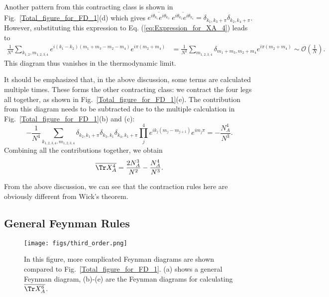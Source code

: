 Another pattern from this contracting class is shown in Fig.~\ref{Total_figure_for_FD_1}(d)
which gives $\overline{e^{i\theta_{k_{1}}}e^{i\theta_{k_{3}}}}\;\overline{e^{i\theta_{k_{2}}}e^{i\theta_{k_{4}}}}=\delta_{k_{1},k_{3}+\pi}\delta_{k_{2},k_{4}+\pi}$.
However, substituting this expression to Eq. (\ref{eq:Expression_for_XA_4})
leads to
\begin{equation}
\begin{aligned}\frac{1}{N^{4}}\sum_{k_{1,2},m_{1,2,3,4}}e^{i(k_{1}-k_{2})(m_{1}+m_{3}-m_{2}-m_{4})}e^{i\pi(m_{2}+m_{4})} & =\frac{1}{N^{2}}\sum_{m_{1,2,3,4}}\delta_{m_{1}+m_{3},m_{2}+m_{4}}e^{i\pi(m_{2}+m_{4})} \sim \mathcal{O}\left(\frac{1}{N}\right).
\end{aligned}
\end{equation}
This diagram thus %
vanishes in the thermodynamic limit. 

It should be emphasized that, in the above discussion, some terms %
are calculated multiple times.
These forms the other contracting class: we contract the four legs
all together, as shown in Fig.~\ref{Total_figure_for_FD_1}(e). The
contribution from this diagram needs to be subtracted due to the multiple
calculation in Fig.~\ref{Total_figure_for_FD_1}(b) and (c):
\begin{equation}
-\frac{1}{N^{4}}\sum_{k_{1,2,3,4},m_{1,2,3,4}}\delta_{k_{2},k_{1}+\pi}\delta_{k_{3},k_{1}}\delta_{k_{4},k_{1}+\pi}\prod_{j}^{4}e^{ik_{j}(m_{j}-m_{j+1})}e^{im_{j}\pi}=-\frac{N_{A}^{4}}{N^{3}}.
\end{equation}
Combining all the contributions %
together, we obtain 
\begin{equation}
\overline{\Tr X_{A}^{4}}=\frac{2N_{A}^{3}}{N^{2}}-\frac{N_{A}^{4}}{N^{3}}.
\end{equation}

From the above discussion, we can see that the contraction rules here
are obviously different from %
Wick's theorem. 



\subsection{General Feynman Rules}

\begin{figure*}
\texttt{[image: figs/third\_order.png]}
\caption{In this figure, more complicated Feynman diagrams are shown compared %
to Fig.~\ref{Total_figure_for_FD_1}. (a) shows a general Feynman diagram,
(b)-(e) are the Feynman diagrams for calculating $\overline{\Tr X_{A}^{6}}$.}
\label{Total_figure_for_FD_2}
\end{figure*}

